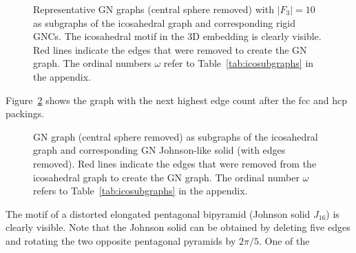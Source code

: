 \begin{figure}[htb]
    \caption{Representative GN graphs (central sphere removed) with $|F_3|=10$
    as subgraphs of the icosahedral graph and corresponding rigid GNCs. The
    icosahedral motif in the 3D embedding is clearly visible.  Red lines
    indicate the edges that were removed to create the GN graph. The ordinal
    numbers $\omega$ refer to Table~\ref{tab:icosubgraphs} in the appendix.}
    \label{fig:GNicographs}
\end{figure}

Figure~\ref{fig:GNJohnsongraph} shows the graph with the next highest edge count
after the \ac{fcc} and \ac{hcp} packings. 
%
\begin{figure}[htb]
    \centering
    \caption{GN graph (central sphere removed) as subgraphs of the icosahedral
    graph and corresponding GN Johnson-like solid (with edges removed). Red
    lines indicate the edges that were removed from the icosahedral graph to
    create the GN graph. The ordinal number $\omega$ refers to
    Table~\ref{tab:icosubgraphs} in the appendix.}
    \label{fig:GNJohnsongraph}
\end{figure}
%
The motif of a distorted elongated pentagonal bipyramid (Johnson solid $J_{16}$)
is clearly visible. Note that the Johnson solid can be obtained by deleting five
edges and rotating the two opposite pentagonal pyramids by $2\pi /5$. One of the
